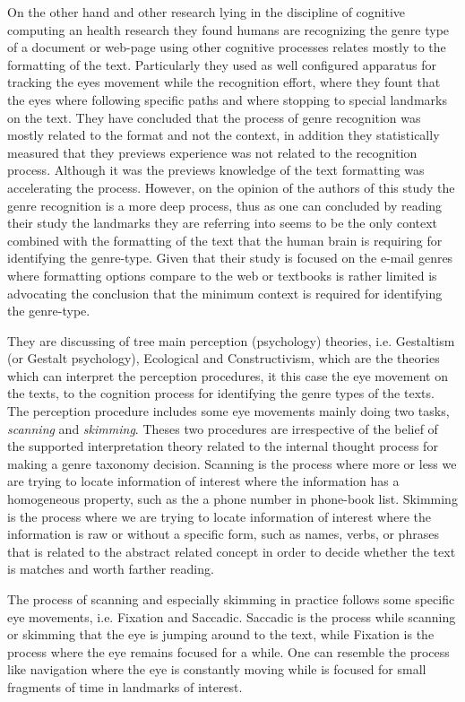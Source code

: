 On the other hand and other research lying in the discipline of cognitive computing an health research they found humans are recognizing the genre type of a document or web-page using other cognitive processes relates mostly to the formatting of the text. Particularly they used as well configured apparatus for tracking the eyes movement while the recognition effort, where they fount that the eyes where following specific paths and where stopping to special landmarks on the text. They have concluded that the process of genre recognition was mostly related to the format and not the context, in addition they statistically measured that they previews experience was not related to the recognition process. Although it was the previews knowledge of the text formatting was accelerating the process. However, on the opinion of the authors of this study the genre recognition is a more deep process, thus as one can concluded by reading their study the landmarks they are referring into seems to be the only context combined with the formatting of the text that the human brain is requiring for identifying the genre-type. Given that their study is focused on the e-mail genres where formatting options compare to the web or textbooks is rather limited is advocating the conclusion that the minimum context is required for identifying the genre-type.

They are discussing of tree main perception (psychology) theories, i.e. Gestaltism (or Gestalt psychology), Ecological and Constructivism, which are the theories which can interpret the perception procedures, it this case the eye movement on the texts, to the cognition process for identifying the genre types of the texts. The perception procedure includes some eye movements mainly doing two tasks, \textit{scanning} and \textit{skimming}. Theses two procedures are irrespective of the belief of the supported interpretation theory related to the internal thought process for making a genre taxonomy decision. Scanning is the process where more or less we are trying to locate information of interest where the information has a homogeneous property, such as the a phone number in phone-book list. Skimming is the process where we are trying to locate information of interest where the information is raw or without a specific form, such as names, verbs, or phrases that is related to the abstract related concept in order to decide whether the text is matches and worth farther reading. 

The process of scanning and especially skimming in practice follows some specific eye movements, i.e. Fixation and Saccadic. Saccadic is the process while scanning or skimming that the eye is jumping around to the text, while Fixation is the process where the eye remains focused for a while. One can resemble the process like navigation where the eye is constantly moving while is focused for small fragments of time in landmarks of interest.

